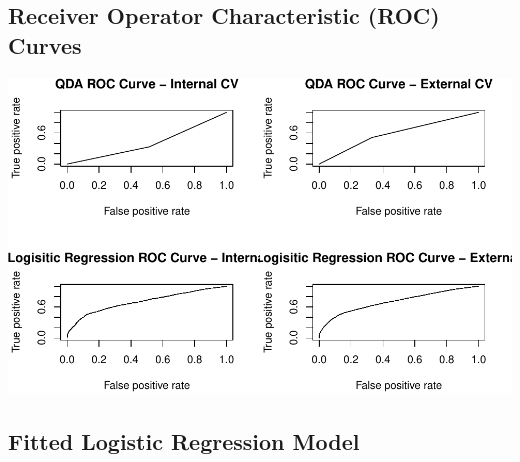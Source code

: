 \documentclass[american,]{article}
\begin{document}
\hypertarget{receiver-operator-characteristic-roc-curves}{%
\subsection{\texorpdfstring{\textbf{Receiver Operator Characteristic (ROC) Curves}}{Receiver Operator Characteristic (ROC) Curves}}\label{receiver-operator-characteristic-roc-curves}}

\begin{center}\includegraphics{Final_Project_Applied_files/figure-latex/ROC curves-1} \end{center}

\hypertarget{fitted-logistic-regression-model}{%
\subsection{\texorpdfstring{\textbf{Fitted Logistic Regression Model}}{Fitted Logistic Regression Model}}\label{fitted-logistic-regression-model}}

\begingroup\fontsize{10}{12}\selectfont
\end{document}

